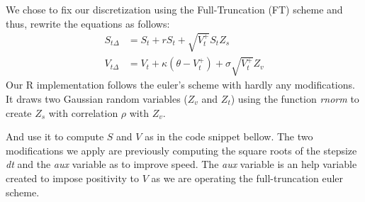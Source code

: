 \documentclass[12pt,twoside]{reedthesis}
\theoremstyle{definition}
\theoremstyle{definition}
\theoremstyle{remark}
\begin{document}
  We chose to fix our discretization using the Full-Truncation (FT) scheme
  and thus, rewrite the equations as follows:
  \begin{align}
  \label{eq:st1}
  S_{t\Delta} &= S_t + rS_t + \sqrt{V_{t}^{+}} S_t Z_s \\
  \label{eq:vt1}
  V_{t\Delta} &= V_t + \kappa (\theta - V_{t}^{+}) + \sigma \sqrt{V_{t}^{+}} Z_v 
  \end{align}
  Our R implementation follows the euler's scheme with hardly any
  modifications. It draws two Gaussian random variables (\(Z_v\) and
  \(Z_t\)) using the function \emph{rnorm} to create \(Z_s\) with
  correlation \(\rho\) with \(Z_v\).
  \begin{Shaded}
  \begin{Highlighting}[]
  \StringTok{ }\OperatorTok{::}
  \StringTok{ }\OperatorTok{::}
  \StringTok{ }\OperatorTok{*}\StringTok{ }\OperatorTok{+}\StringTok{ }\NormalTok{(}\NormalTok{(} \OperatorTok{-}\StringTok{ }\OperatorTok{^}\NormalTok{)) }\OperatorTok{*}\StringTok{ }
  \end{Highlighting}
  \end{Shaded}
  And use it to compute \(S\) and \(V\) as in the code snippet bellow. The
  two modifications we apply are previously computing the square roots of
  the stepsize \emph{dt} and the \emph{aux} variable as to improve speed.
  The \emph{aux} variable is an help variable created to impose positivity
  to \(V\) as we are operating the full-truncation euler scheme.
  \begin{Shaded}
  \begin{Highlighting}[]
  \StringTok{ }\OperatorTok{*}\StringTok{ }\NormalTok{(} \OperatorTok{+}\StringTok{ }\OperatorTok{*}\StringTok{ }\OperatorTok{+}\StringTok{ }\OperatorTok{*}\StringTok{ }\OperatorTok{*}\StringTok{ }
  \StringTok{ }\OperatorTok{+}\StringTok{ }\OperatorTok{*}\StringTok{ }\OperatorTok{*}\StringTok{ }\OperatorTok{-}\StringTok{ }\OperatorTok{+}\StringTok{ }
  \StringTok{                     }\OperatorTok{*}\StringTok{ }\OperatorTok{*}\StringTok{ }\OperatorTok{*}\StringTok{ }
  \end{Highlighting}
  \end{Shaded}
\end{document}
